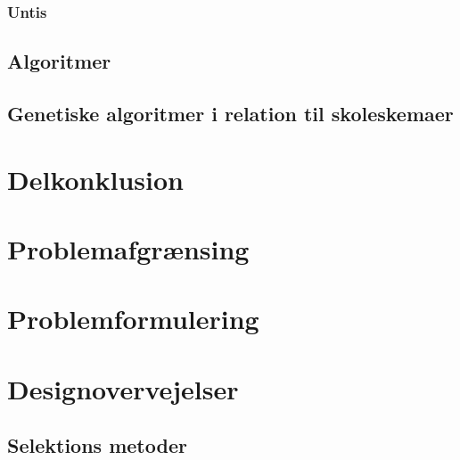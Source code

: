     \subsubsection{Untis}
    	
     
     

   

  \subsection{Algoritmer}
  	
    
    \subsection{Genetiske algoritmer i relation til skoleskemaer}
    	
    
    

\section{Delkonklusion}
    

\section{Problemafgrænsing}
    

\section{Problemformulering}
    

\section{Designovervejelser}
    
    
    \subsection{Selektions metoder}
    	
    	